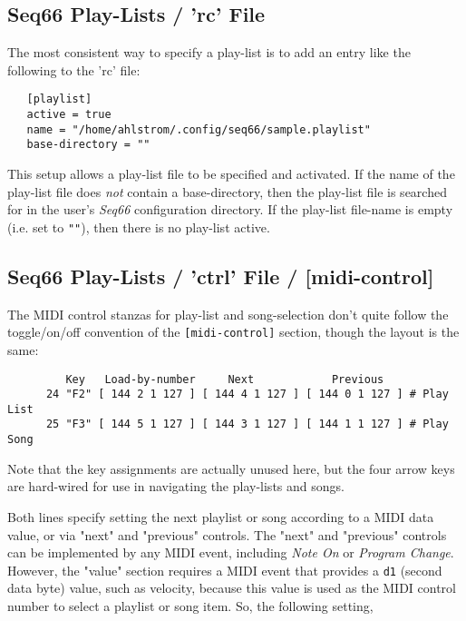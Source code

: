 \subsection{Seq66 Play-Lists / 'rc' File}
\label{subsec:playlist_rc_file}

   The most consistent way to specify a play-list is to add an entry like the
   following to the 'rc' file:

   \begin{verbatim}
   [playlist]
   active = true
   name = "/home/ahlstrom/.config/seq66/sample.playlist"
   base-directory = ""
   \end{verbatim}

   This setup allows a play-list file to be specified and activated.
   If the name of the play-list file does \textsl{not} contain a base-directory,
   then the play-list file is searched for in the user's \textsl{Seq66}
   configuration directory.
   If the play-list file-name is empty (i.e. set to \texttt{""}), then there is
   no play-list active.

\subsection{Seq66 Play-Lists / 'ctrl' File / [midi-control]}
\label{subsec:playlist_rc_file_midi_ctrl}

   The MIDI control stanzas for play-list and song-selection don't quite follow
   the toggle/on/off convention of the \texttt{[midi-control]} section, though
   the layout is the same:

   \begin{verbatim}
         Key   Load-by-number     Next            Previous
      24 "F2" [ 144 2 1 127 ] [ 144 4 1 127 ] [ 144 0 1 127 ] # Play List
      25 "F3" [ 144 5 1 127 ] [ 144 3 1 127 ] [ 144 1 1 127 ] # Play Song
   \end{verbatim}

   Note that the key assignments are actually unused here, but the four
   arrow keys are hard-wired for use in navigating the play-lists and songs.

   Both lines specify setting the next playlist or song according to a 
   MIDI data value,
   or via "next" and "previous" controls.  The "next" and "previous" controls
   can be implemented by any MIDI event, including \textsl{Note On} or
   \textsl{Program Change}.  However, the "value" section requires a MIDI event
   that provides a \texttt{d1} (second data byte) value, such as velocity,
   because this value is
   used as the MIDI control number to select a playlist or song item.
   So, the following setting,

